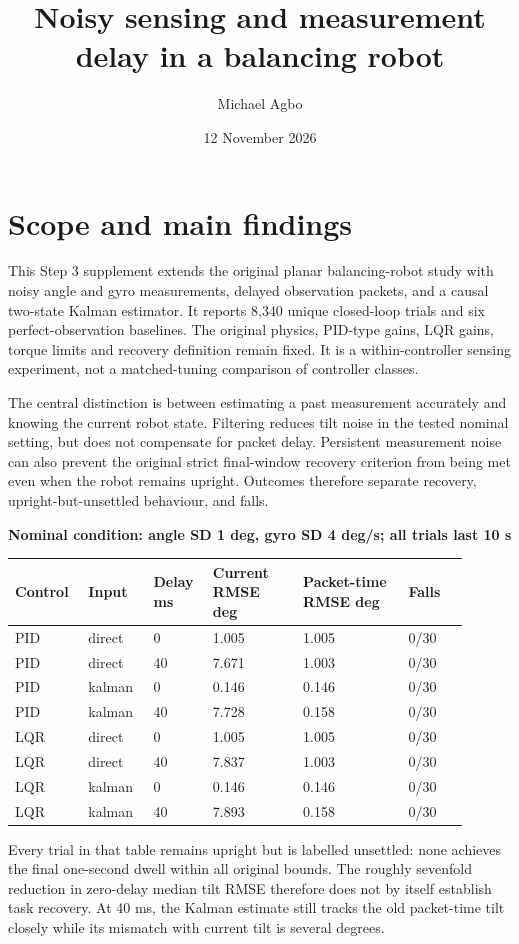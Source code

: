 \documentclass[11pt,a4paper]{article}
\title{Noisy sensing and measurement delay in a balancing robot}
\author{Michael Agbo}
\date{12 November 2026}
\begin{document}
\maketitle
\section*{Scope and main findings}
This Step 3 supplement extends the original planar balancing-robot study with noisy angle and gyro measurements, delayed observation packets, and a causal two-state Kalman estimator. It reports 8,340 unique closed-loop trials and six perfect-observation baselines. The original physics, PID-type gains, LQR gains, torque limits and recovery definition remain fixed. It is a within-controller sensing experiment, not a matched-tuning comparison of controller classes.

The central distinction is between estimating a past measurement accurately and knowing the current robot state. Filtering reduces tilt noise in the tested nominal setting, but does not compensate for packet delay. Persistent measurement noise can also prevent the original strict final-window recovery criterion from being met even when the robot remains upright. Outcomes therefore separate recovery, upright-but-unsettled behaviour, and falls.

\textbf{Nominal condition: angle SD 1 deg, gyro SD 4 deg/s; all trials last 10 s}
\begin{longtable}{p{0.126\linewidth}p{0.135\linewidth}p{0.117\linewidth}p{0.18\linewidth}p{0.216\linewidth}p{0.126\linewidth}}
\toprule
Control & Input & Delay ms & Current RMSE deg & Packet-time RMSE deg & Falls \\ \midrule \endhead
PID & direct & 0 & 1.005 & 1.005 & 0/30 \\
PID & direct & 40 & 7.671 & 1.003 & 0/30 \\
PID & kalman & 0 & 0.146 & 0.146 & 0/30 \\
PID & kalman & 40 & 7.728 & 0.158 & 0/30 \\
LQR & direct & 0 & 1.005 & 1.005 & 0/30 \\
LQR & direct & 40 & 7.837 & 1.003 & 0/30 \\
LQR & kalman & 0 & 0.146 & 0.146 & 0/30 \\
LQR & kalman & 40 & 7.893 & 0.158 & 0/30 \\
\bottomrule
\end{longtable}
Every trial in that table remains upright but is labelled unsettled: none achieves the final one-second dwell within all original bounds. The roughly sevenfold reduction in zero-delay median tilt RMSE therefore does not by itself establish task recovery. At 40 ms, the Kalman estimate still tracks the old packet-time tilt closely while its mismatch with current tilt is several degrees.
\end{document}

